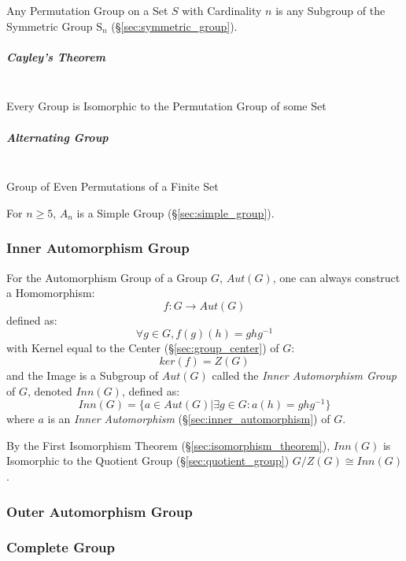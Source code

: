 Any Permutation Group on a Set $S$ with Cardinality $n$ is any
Subgroup of the Symmetric Group $\mathrm{S}_n$
(\S\ref{sec:symmetric_group}).



\subparagraph{Cayley's Theorem}\label{sec:cayleys_theorem}
\hfill \\

Every Group is Isomorphic to the Permutation Group of some Set



\subparagraph{Alternating Group}\label{sec:alternating_group}
\hfill \\

Group of Even Permutations of a Finite Set

For $n \geq 5$, $A_n$ is a Simple Group (\S\ref{sec:simple_group}).



\subsubsection{Inner Automorphism Group}\label{sec:inner_automorphism_group}

For the Automorphism Group of a Group $G$, $Aut(G)$, one can always
construct a Homomorphism:
\[
    f : G \rightarrow Aut(G)
\]
defined as:
\[
    \forall g \in G, f (g) (h) = g h g^{-1}
\]
with Kernel equal to the Center (\S\ref{sec:group_center}) of $G$:
\[
    ker(f) = Z(G)
\]
and the Image is a Subgroup of $Aut(G)$ called the \emph{Inner
  Automorphism Group} of $G$, denoted $Inn(G)$, defined as:
\[
    Inn(G) = \{ a \in Aut(G) | \exists g \in G : a(h) = g h g^{-1} \}
\]
where $a$ is an \emph{Inner Automorphism}
(\S\ref{sec:inner_automorphism}) of $G$.

By the First Isomorphism Theorem (\S\ref{sec:isomorphism_theorem}),
$Inn(G)$ is Isomorphic to the Quotient Group
(\S\ref{sec:quotient_group}) $G / Z(G) \cong Inn(G)$.



\subsubsection{Outer Automorphism Group}\label{sec:outer_automorphism_group}

\subsubsection{Complete Group}\label{sec:complete_group}



